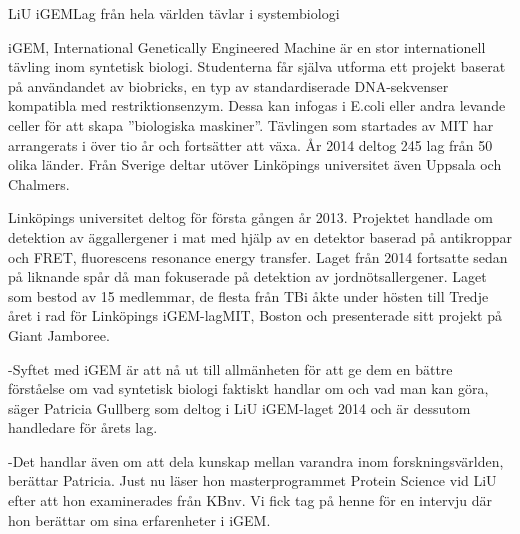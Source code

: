 \begin{news}{1}{LiU iGEM}{Lag från hela världen tävlar i systembiologi}{}{}

iGEM, International Genetically Engineered Machine är en stor
internationell tävling inom syntetisk biologi. Studenterna får själva
utforma ett projekt baserat på användandet av biobricks, en typ av
standardiserade DNA-sekvenser kompatibla med restriktionsenzym. Dessa
kan infogas i E.coli eller andra levande celler för att skapa
”biologiska maskiner”. Tävlingen som startades av MIT har arrangerats
i över tio år och fortsätter att växa. År 2014 deltog 245 lag från 50
olika länder. Från Sverige deltar utöver Linköpings universitet även
Uppsala och Chalmers.





Linköpings universitet deltog för första gången år 2013. Projektet
handlade om detektion av äggallergener i mat med hjälp av en detektor
baserad på antikroppar och FRET, fluorescens resonance energy
transfer. Laget från 2014 fortsatte sedan på liknande spår då man
fokuserade på detektion av jordnötsallergener. Laget som bestod av 15
medlemmar, de flesta från TBi åkte under hösten till Tredje året i rad för Linköpings iGEM-lagMIT, Boston och
presenterade sitt projekt på Giant Jamboree.

-Syftet med iGEM är att nå ut till allmänheten för att ge dem en bättre 
förståelse om vad syntetisk biologi faktiskt handlar om och vad man kan göra, 
säger Patricia Gullberg som deltog i LiU iGEM-laget 2014 och är dessutom 
handledare för årets lag.  

-Det handlar även om att dela kunskap mellan varandra inom forskningsvärlden, 
berättar Patricia. Just nu läser hon masterprogrammet Protein Science vid LiU 
efter att hon examinerades från KBnv. Vi fick tag på henne för en intervju 
där hon berättar om sina erfarenheter i iGEM.
\end {news}


